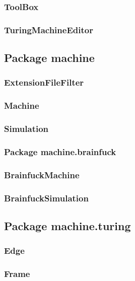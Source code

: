 \documentclass[%
  a4paper,%
  11pt,%
  blue,%
  hyperref	%
  ]{tubsartcl}
\begin{document}
\subsubsection{ToolBox}

\subsubsection{TuringMachineEditor}


\subsection{Package machine}

\subsubsection{ExtensionFileFilter}

\subsubsection{Machine}

\subsubsection{Simulation}


\subsubsection{Package machine.brainfuck}

\subsubsection{BrainfuckMachine}

\subsubsection{BrainfuckSimulation}


\subsection{Package machine.turing}

\subsubsection{Edge}

\subsubsection{Frame}
\end{document}
